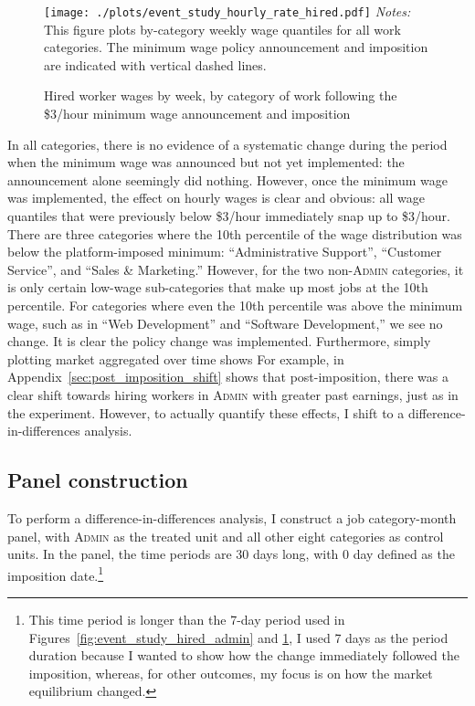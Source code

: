 \documentclass[AER]{AEA}
\newcommand{\admin}{\textsc{Admin}}
\begin{document}
\begin{figure}[h!]
\centering 
\caption{Hired worker wages by week, by category of work following the \$3/hour minimum wage announcement and imposition \label{fig:event_study_hourly_rate_hired} } 
\begin{minipage}{1.0 \linewidth}
\texttt{[image: ./plots/event\_study\_hourly\_rate\_hired.pdf]} 
{\footnotesize
  \emph{Notes:} This figure plots by-category weekly wage quantiles for all work categories.
  The minimum wage policy announcement and imposition are indicated with vertical dashed lines.
}
\end{minipage} 
\end{figure} 

In all categories, there is no evidence of a systematic change during the period when the minimum wage was announced but not yet implemented: the announcement alone seemingly did nothing.
However, once the minimum wage was implemented, the effect on hourly wages is clear and obvious: all wage quantiles that were previously below \$3/hour immediately snap up to \$3/hour.
There are three categories where the 10th percentile of the wage distribution was below the platform-imposed minimum: ``Administrative Support'', ``Customer Service'', and ``Sales \& Marketing.''
However, for the two non-\admin{} categories, it is only certain low-wage sub-categories that make up most jobs at the 10th percentile. 
For categories where even the 10th percentile was above the minimum wage, such as in ``Web Development'' and ``Software Development,'' we see no change.
It is clear the policy change was implemented.
Furthermore, simply plotting market aggregated over time shows
For example, in Appendix~\ref{sec:post_imposition_shift} shows that post-imposition, there was a clear shift towards hiring workers in \admin{} with greater past earnings, just as in the experiment.
However, to actually quantify these effects, I shift to a difference-in-differences analysis.

\subsection{Panel construction}

To perform a difference-in-differences analysis, I construct a job category-month panel, with \admin{} as the treated unit and all other eight categories as control units.
In the panel, the time periods are 30 days long, with 0 day defined as the imposition date.\footnote{
  This time period is longer than the 7-day period used in Figures~\ref{fig:event_study_hired_admin} and \ref{fig:event_study_hourly_rate_hired}, I used 7 days as the period duration because I wanted to show how the change immediately followed the imposition, whereas, for other outcomes, my focus is on how the market equilibrium changed. 
}
\end{document}
